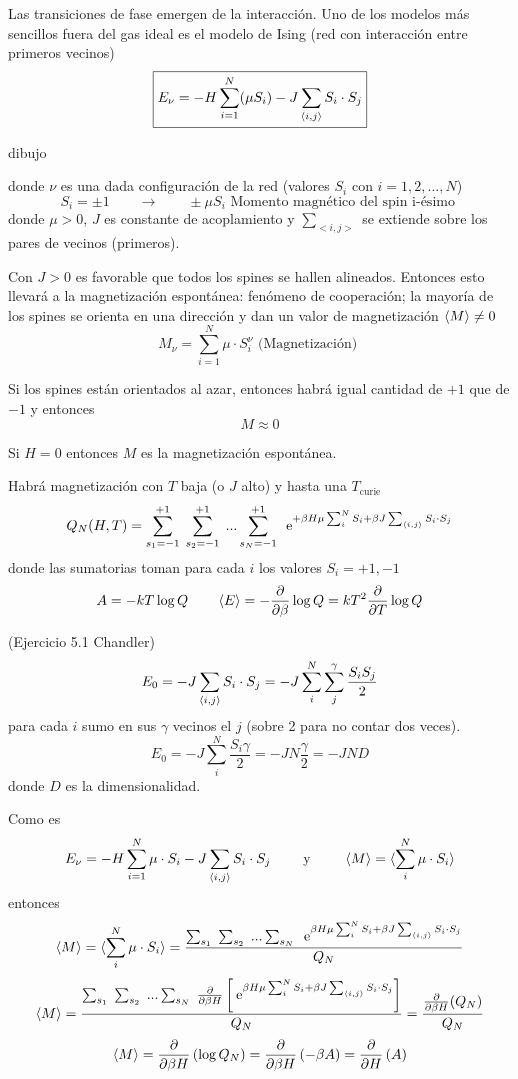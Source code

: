 \documentclass[10pt,oneside]{CBFT_book}
\begin{document}
Las transiciones de fase emergen de la interacción. Uno de los modelos más sencillos fuera del gas ideal es el modelo de
Ising (red con interacción entre primeros vecinos)
\[
	\boxed{ E_\nu = -H \sum_{i=1}^N (\mu S_i) - J \sum_{\braket{i,j}} S_i \cdot S_j }
	\label{energia_ising}
\]

dibujo 


donde $\nu$ es una dada configuración de la red (valores $S_i$ con $i=1,2,...,N$)
\[
	S_i = \pm 1 \qquad \rightarrow \qquad \pm \mu S_i \text{ Momento magnético del spin i-ésimo }
\]
donde $\mu>0$, $J$ es constante de acoplamiento y $\sum_{<i,j>}$ se extiende sobre los pares de vecinos (primeros).

Con $J>0$ es favorable que todos los spines se hallen alineados. Entonces esto llevará a la magnetización espontánea: 
fenómeno de cooperación; la mayoría de los spines se orienta en una dirección y dan un valor de magnetización 
$\braket{M} \neq 0$
\[
	M_\nu = \sum_{i=1}^N \mu \cdot S_i^\nu
	\text{ (Magnetización) }
\]

Si los spines están orientados al azar, entonces habrá igual cantidad de $+1$ que de $-1$ y entonces
\[
	M \approx 0
\]

Si $H=0$ entonces $M$ es la magnetización espontánea.

Habrá magnetización con $T$ baja (o $J$ alto) y hasta una $T_\text{curie}$
\[
	Q_N(H,T) = \sum_{s_1=-1}^{+1} \; \sum_{s_2=-1}^{+1} \; ... \sum_{s_N=-1}^{+1} \;
	\:\mathrm{e}^{ +\beta H \mu \sum_i^N S_i + \beta J \sum_{\braket{i,j}} S_i \cdot S_j }
\]
donde las sumatorias toman para cada $i$ los valores $S_i = +1, -1$
\[
	A = -kT\log Q \qquad \braket{E} = -\frac{\partial^{\hspace{-0.05em}} {}}{\partial {\beta}^{\hspace{-0.05em}}}\log Q = kT^2 \frac{\partial^{\hspace{-0.05em}} {}}{\partial {T}^{\hspace{-0.05em}}} \log Q
\]

\begin{ejemplo}{(Ejercicio 5.1 Chandler)}
\[
	E_0 = -J \sum_{\braket{i,j}} S_i \cdot S_j = -J  \sum_i^N \sum_j^\gamma \frac{S_i S_j}{2}
\]
para cada $i$ sumo en sus $\gamma$ vecinos el $j$ (sobre 2 para no contar dos veces).
\[
	E_0 = -J \sum_i^N \frac{S_i\gamma}{2} = -J N\frac{\gamma}{2} = -JND
\]
donde $D$ es la dimensionalidad.
\end{ejemplo}


Como es
\[
	E_\nu =  -H \sum_{i=1}^N \mu \cdot S_i - J \sum_{\braket{i,j}} S_i \cdot S_j \qquad
	\text{ y } \qquad \braket{M} = \braket{ \sum_i^N \mu \cdot S_i }
\]
entonces
\[
	\braket{M} = \braket{ \sum_i^N \mu \cdot S_i } = 
	\frac{ \sum_{s_1} \; \sum_{s_2} \; ... \sum_{s_N} \;
	\:\mathrm{e}^{ \beta H \mu \sum_i^N S_i + \beta J \sum_{\braket{i,j}} S_i \cdot S_j } }{Q_N}
\]
\[
	\braket{M} = \frac{ \sum_{s_1} \; \sum_{s_2} \; ... \sum_{s_N} \;
	\frac{\partial^{\hspace{-0.05em}} {}}{\partial {\beta H}^{\hspace{-0.05em}}} \left[ \:\mathrm{e}^{ \beta H \mu \sum_i^N S_i + \beta J \sum_{\braket{i,j}} S_i \cdot S_j } 
	\right]}{Q_N} = \frac{\frac{\partial^{\hspace{-0.05em}} {}}{\partial {\beta H}^{\hspace{-0.05em}}}(Q_N)}{Q_N}
\]
\[
	\braket{M} = \frac{\partial^{\hspace{-0.05em}} {}}{\partial {\beta H}^{\hspace{-0.05em}}}\left( \log Q_N \right) = \frac{\partial^{\hspace{-0.05em}} {}}{\partial {\beta H}^{\hspace{-0.05em}}}\left( -\beta A \right) =
	\frac{\partial^{\hspace{-0.05em}} {}}{\partial {H}^{\hspace{-0.05em}}}\left( A \right)
\]
\end{document}
